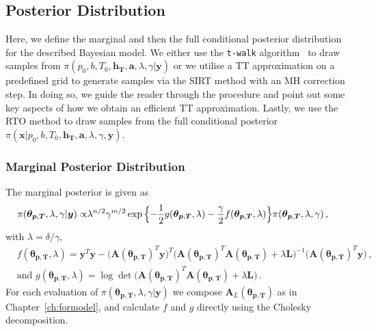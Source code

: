 \subsection{Posterior Distribution}
Here, we define the marginal and then the full conditional posterior distribution for the described Bayesian model.
We either use the \texttt{t-walk} algorithm~\cite{christen2010general} to draw samples from $\pi(p_0,b,T_0,\bm{h_T},\bm{a} ,\lambda, \gamma| \bm{y})$ or we utilise a TT approximation on a predefined grid to generate samples via the SIRT method with an MH correction step.
In doing so, we guide the reader through the procedure and point out some key aspects of how we obtain an efficient TT approximation.
Lastly, we use the RTO method to draw samples from the full conditional posterior $\pi(\bm{x}|p_0,b,T_0,\bm{h_T},\bm{a} ,\lambda, \gamma, \bm{y})$.

\subsubsection{Marginal Posterior Distribution}
The marginal posterior is given as
\begin{align}
	\pi( \bm{\theta}_{\bm{p}, \bm{T}},\lambda,\gamma  | \bm{y}) \propto &  \lambda^{n/2} \gamma^{m/2}   \exp{ \Bigl\{ - \frac{1}{2} g ( \bm{\theta}_{\bm{p}, \bm{T}},\lambda) - \frac{\gamma}{2} f (\bm{\theta}_{\bm{p}, \bm{T}},\lambda) \Bigr\}} \pi(\bm{\theta}_{\bm{p}, \bm{T}},\lambda,\gamma ) \, ,
	\label{eq:MargPostFull}
\end{align}
with $\lambda= \delta / \gamma$,
\begin{subequations}
	\label{eq:fandgTrue}
	\begin{align}
		&f ( \bm{\theta}_{\bm{p}, \bm{T}},\lambda) = \bm{y}^T \bm{y} - \big(\bm{A}(\bm{\theta}_{\bm{p}, \bm{T}})^T \bm{y}\big)^T \big(\bm{A}(\bm{\theta}_{\bm{p}, \bm{T}})^T  \bm{A}(\bm{\theta}_{\bm{p}, \bm{T}}) + \lambda \bm{L}\big)^{-1} \big(\bm{A}(\bm{\theta}_{\bm{p}, \bm{T}})^T \bm{y}\big)  \label{eq:fFullAppl} \, ,  \\
		&\text{and } g(\bm{\theta}_{\bm{p}, \bm{T}},\lambda) = \log \det \big(\bm{A}(\bm{\theta}_{\bm{p}, \bm{T}})^T  \bm{A}(\bm{\theta}_{\bm{p}, \bm{T}}) + \lambda \bm{L}\big) \label{eq:gFullAppl} \, .
	\end{align}
\end{subequations}
For each evaluation of $\pi( \bm{\theta}_{\bm{p}, \bm{T}},\lambda,\gamma  | \bm{y})$ we compose $\bm{A}_L(\bm{\theta}_{\bm{p}, \bm{T}})$ as in Chapter~\ref{ch:formodel}, and calculate $f$ and $g$ directly using the Cholesky decomposition.


